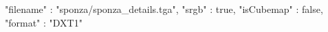 { 
	"filename" : "sponza/sponza_details.tga", 
	"srgb" : true,
	"isCubemap" : false,
	"format" : "DXT1"
}